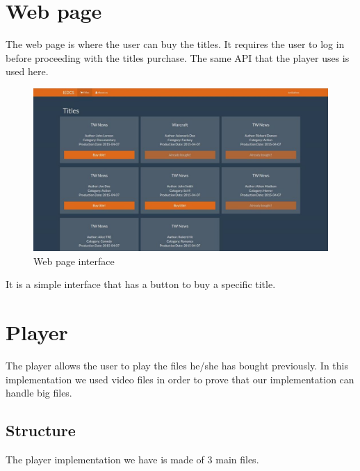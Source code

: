 \documentclass[11pt,a4paper]{report}
\begin{document}
\section{Web page}
The web page is where the user can buy the titles.
It requires the user to log in before proceeding with the titles purchase.
The same API that the player uses is used here.

\begin{figure}[H]
\centerline{\includegraphics[width=500pt]{images/webpage.jpg}}
\caption{Web page interface}
\label{webpage}
\end{figure}

It is a simple interface that has a button to buy a specific title.

\section{Player}
The player allows the user to play the files he/she has bought previously. 
\newline  In this implementation we used video files in order to prove that our implementation can handle big files.

\subsection{Structure}
The player implementation we have is made of 3 main files. 
\end{document}
